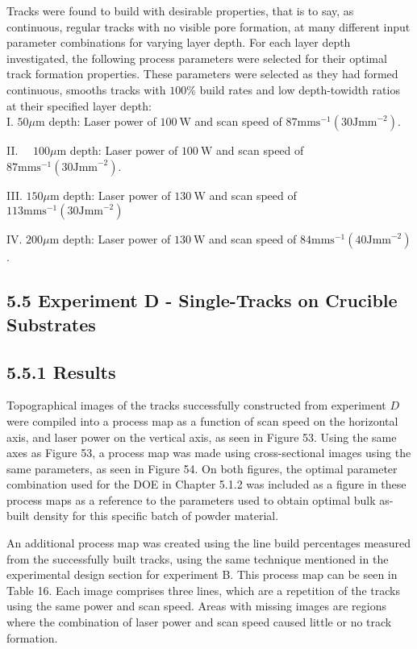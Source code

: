 \documentclass[10pt]{article}
\begin{document}
Tracks were found to build with desirable properties, that is to say, as continuous, regular tracks with no visible pore formation, at many different input parameter combinations for varying layer depth. For each layer depth investigated, the following process parameters were selected for their optimal track formation properties. These parameters were selected as they had formed continuous, smooths tracks with $100 \%$ build rates and low depth-towidth ratios at their specified layer depth:\\
I. $50 \mu \mathrm{m}$ depth: Laser power of $100 \mathrm{~W}$ and scan speed of $87 \mathrm{mms}^{-1}\left(30 \mathrm{Jmm}^{-2}\right)$.

II. $\quad 100 \mu \mathrm{m}$ depth: Laser power of $100 \mathrm{~W}$ and scan speed of $87 \mathrm{mms}^{-1}\left(30 \mathrm{Jmm}^{-2}\right)$.

III. $150 \mu \mathrm{m}$ depth: Laser power of $130 \mathrm{~W}$ and scan speed of $113 \mathrm{mms}^{-1}\left(30 \mathrm{Jmm}^{-2}\right)$

IV. $200 \mu \mathrm{m}$ depth: Laser power of $130 \mathrm{~W}$ and scan speed of $84 \mathrm{mms}^{-1}\left(40 \mathrm{Jmm}^{-2}\right)$.

\subsection*{5.5 Experiment D - Single-Tracks on Crucible Substrates}
\subsection*{5.5.1 Results}
Topographical images of the tracks successfully constructed from experiment $D$ were compiled into a process map as a function of scan speed on the horizontal axis, and laser power on the vertical axis, as seen in Figure 53. Using the same axes as Figure 53, a process map was made using cross-sectional images using the same parameters, as seen in Figure 54. On both figures, the optimal parameter combination used for the DOE in Chapter 5.1.2 was included as a figure in these process maps as a reference to the parameters used to obtain optimal bulk as-built density for this specific batch of powder material.

An additional process map was created using the line build percentages measured from the successfully built tracks, using the same technique mentioned in the experimental design section for experiment B. This process map can be seen in Table 16. Each image comprises three lines, which are a repetition of the tracks using the same power and scan speed. Areas with missing images are regions where the combination of laser power and scan speed caused little or no track formation.
\end{document}
